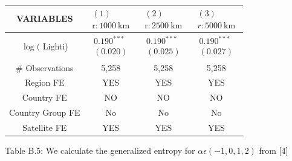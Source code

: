 \documentclass[10pt]{article}
\begin{document}
\begin{center}
\begin{tabular}{|c|c|c|c|}
\hline
VARIABLES & $\begin{array}{c}(1) \\ \mathrm{r}: 1000 \mathrm{~km}\end{array}$ & $\begin{array}{c}(2) \\ \mathrm{r}: 2500 \mathrm{~km}\end{array}$ & $\begin{array}{c}(3) \\ r: 5000 \mathrm{~km}\end{array}$ \\
\hline
$\log ($ Lighti) & $\begin{array}{l}0.190^{* * *} \\ (0.020)\end{array}$ & $\begin{array}{l}0.190^{* * *} \\ (0.025)\end{array}$ & $\begin{array}{l}0.190^{* * *} \\ (0.027)\end{array}$ \\
\hline
\# Observations & 5,258 & 5,258 & 5,258 \\
\hline
Region FE & YES & YES & YES \\
\hline
Country FE & NO & NO & NO \\
\hline
Country Group FE & No & No & No \\
\hline
Satellite FE & YES & YES & YES \\
\hline
\end{tabular}
\end{center}

Table B.5: We calculate the generalized entropy for $\alpha \epsilon(-1,0,1,2)$ from [4]
\end{document}
